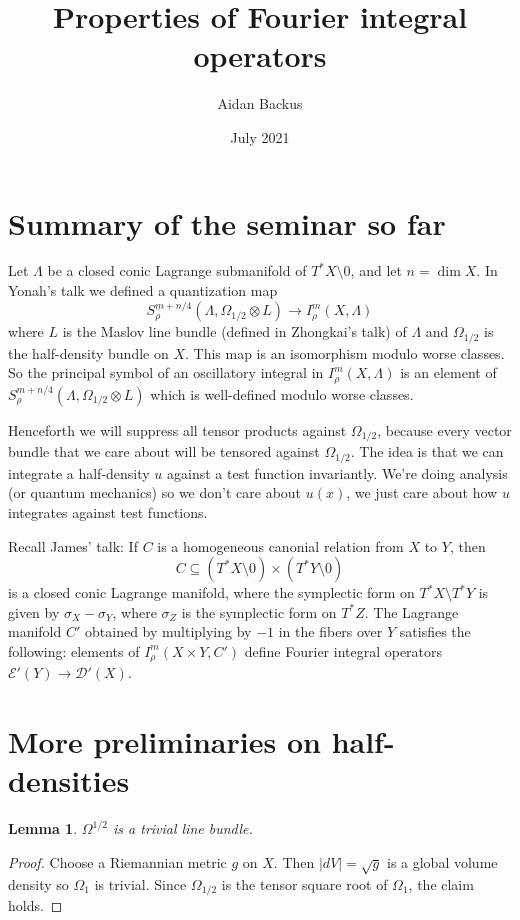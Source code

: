 \documentclass[reqno,12pt,letterpaper]{amsart}
\title[Fourier integral operators properties]{Properties of Fourier integral operators}
\author{Aidan Backus}
\date{July 2021}
\newtheorem{lemma}[theorem]{Lemma}
\theoremstyle{definition}
\begin{document}

\maketitle

\section{Summary of the seminar so far}
Let $\Lambda$ be a closed conic Lagrange submanifold of $T^*X \setminus 0$, and let $n = \dim X$.
In Yonah's talk we defined a quantization map
$$ S^{m + n/4}_\rho(\Lambda, \Omega_{1/2} \otimes L) \to I^m_\rho(X, \Lambda)$$
where $L$ is the Maslov line bundle (defined in Zhongkai's talk) of $\Lambda$ and $\Omega_{1/2}$ is the half-density bundle on $X$.
This map is an isomorphism modulo worse classes.
So the principal symbol of an oscillatory integral in $I^m_\rho(X, \Lambda)$ is an element of $S^{m + n/4}_\rho(\Lambda, \Omega_{1/2} \otimes L)$ which is well-defined modulo worse classes.

Henceforth we will suppress all tensor products against $\Omega_{1/2}$, because every vector bundle that we care about will be tensored against $\Omega_{1/2}$.
The idea is that we can integrate a half-density $u$ against a test function invariantly. We're doing analysis (or quantum mechanics) so we don't care about $u(x)$, we just care about how $u$ integrates against test functions.

Recall James' talk: If $C$ is a homogeneous canonial relation from $X$ to $Y$, then
$$C \subseteq (T^*X \setminus 0) \times (T^*Y \setminus 0)$$
is a closed conic Lagrange manifold, where the symplectic form on $T^* X \setminus T^* Y$ is given by $\sigma_X - \sigma_Y$, where $\sigma_Z$ is the symplectic form on $T^* Z$.
The Lagrange manifold $C'$ obtained by multiplying by $-1$ in the fibers over $Y$ satisfies the following: elements of $I^m_\rho(X \times Y, C')$ define Fourier integral operators $\mathcal E'(Y) \to \mathcal D'(X)$.

\section{More preliminaries on half-densities}
\begin{lemma}
$\Omega^{1/2}$ is a trivial line bundle.
\end{lemma}
\begin{proof}
Choose a Riemannian metric $g$ on $X$. Then $|dV| = \sqrt g$ is a global volume density so $\Omega_1$ is trivial.
Since $\Omega_{1/2}$ is the tensor square root of $\Omega_1$, the claim holds.
\end{proof}
\end{document}
